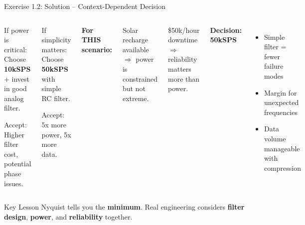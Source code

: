 \documentclass[aspectratio=169,11pt]{beamer}
\begin{document}
\begin{frame}{Exercise 1.2: Solution -- Context-Dependent Decision}
    \begin{columns}
        \begin{alertblock}{If power is critical:}
            Choose \textbf{10kSPS} + invest in good analog filter.
            
            \vspace{0.1cm}
            Accept: Higher filter cost, potential phase issues.
        \end{alertblock}
        
        \vspace{0.2cm}
        \begin{exampleblock}{If simplicity matters:}
            Choose \textbf{50kSPS} with simple RC filter.
            
            \vspace{0.1cm}
            Accept: 5x more power, 5x more data.
        \end{exampleblock}
        
        \textbf{For THIS scenario:}
        
        Solar recharge available $\Rightarrow$ power is constrained but not extreme.
        
        \$50k/hour downtime $\Rightarrow$ reliability matters more than power.
        
        \vspace{0.3cm}
        \textbf{Decision: 50kSPS}
        \begin{itemize}
            \item Simple filter = fewer failure modes
            \item Margin for unexpected frequencies
            \item Data volume manageable with compression
        \end{itemize}
    \end{columns}
    
    \vspace{0.3cm}
    \begin{block}{Key Lesson}
        Nyquist tells you the \textbf{minimum}. Real engineering considers \textbf{filter design}, \textbf{power}, and \textbf{reliability} together.
    \end{block}
\end{frame}
\end{document}
